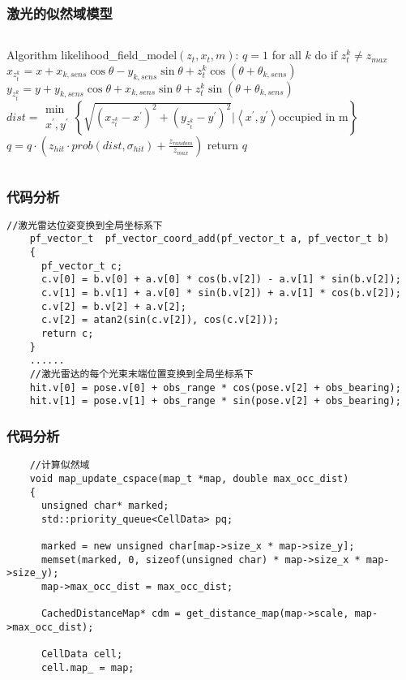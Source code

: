 \begin{frame}[fragile]
  \frametitle{激光的似然域模型}

  \begin{columns}
    \begin{block}

        \begin{algorithmic}[1]
          \State Algorithm likelihood\_field\_model$(z_t, x_t, m)$:
          \State $q = 1$
          \State for all $k$ do
          \State \quad if $z_t^k \neq z_{max}$
          \State \qquad $x_{z_t^k} = x + x_{k, sens} \cos\theta - y_{k, sens} \sin\theta + z_t^k \cos(\theta + \theta_{k, sens})$
          \State \qquad $y_{z_t^k} = y+y_{k, sens}\cos\theta+x_{k, sens}\sin\theta+z_t^k \sin(\theta + \theta_{k, sens})$
          \State \qquad $dist = \substack{\text{min}\\x^\prime, y^\prime} \left\{ \sqrt{(x_{z_t^k}-x^\prime)^2 + (y_{z_t^k} - y^\prime)^2} | \left \langle x^\prime, y^\prime \right \rangle\text{occupied in m} \right\}$
          \State \qquad $q = q \cdot (z_{hit} \cdot prob(dist, \sigma_{hit}) + \frac{z_{random}}{z_{max}})$
          \State return $q$
        \end{algorithmic}
    \end{block}
  \end{columns}
\end{frame}

\begin{frame}[fragile]
  \frametitle{代码分析}
  \begin{lstlisting}[frame=shadowbox]  
    //激光雷达位姿变换到全局坐标系下
    pf_vector_t  pf_vector_coord_add(pf_vector_t a, pf_vector_t b) 
    {
      pf_vector_t c;
      c.v[0] = b.v[0] + a.v[0] * cos(b.v[2]) - a.v[1] * sin(b.v[2]);
      c.v[1] = b.v[1] + a.v[0] * sin(b.v[2]) + a.v[1] * cos(b.v[2]);
      c.v[2] = b.v[2] + a.v[2];
      c.v[2] = atan2(sin(c.v[2]), cos(c.v[2]));
      return c;
    }
    ......
    //激光雷达的每个光束末端位置变换到全局坐标系下
    hit.v[0] = pose.v[0] + obs_range * cos(pose.v[2] + obs_bearing); 
    hit.v[1] = pose.v[1] + obs_range * sin(pose.v[2] + obs_bearing);
  \end{lstlisting}
\end{frame}

\begin{frame}[fragile]
  \frametitle{代码分析}
  \begin{lstlisting}
    //计算似然域
    void map_update_cspace(map_t *map, double max_occ_dist)
    {
      unsigned char* marked;
      std::priority_queue<CellData> pq;

      marked = new unsigned char[map->size_x * map->size_y];
      memset(marked, 0, sizeof(unsigned char) * map->size_x * map->size_y);
      map->max_occ_dist = max_occ_dist;

      CachedDistanceMap* cdm = get_distance_map(map->scale, map->max_occ_dist);

      CellData cell;
      cell.map_ = map;
  \end{lstlisting}
\end{frame}


